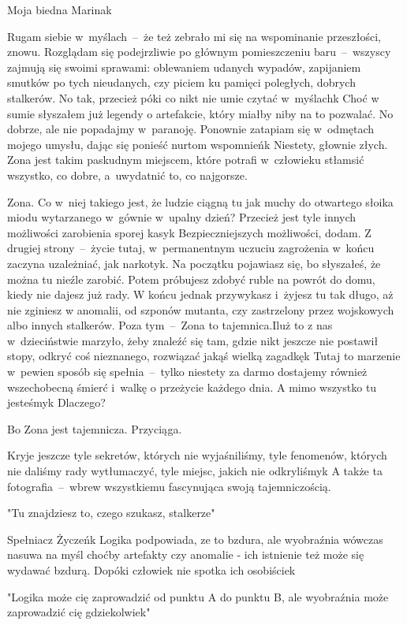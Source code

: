 \documentclass[../MAIN.tex]{subfiles}
\begin{document}
Moja biedna Marina\3k

Rugam siebie w~myślach~--~że też zebrało mi się na wspominanie
przeszłości, znowu. Rozglądam się podejrzliwie po głównym
pomieszczeniu baru~--~wszyscy zajmują się swoimi sprawami:
oblewaniem udanych wypadów, zapijaniem smutków po tych
nieudanych, czy piciem ku pamięci poległych, dobrych stalkerów.
No tak, przecież póki co nikt nie umie czytać w~myślach\3k Choć
w sumie słyszałem już legendy o artefakcie, który miałby niby
na to pozwalać. No dobrze, ale nie popadajmy w~paranoję.
Ponownie zatapiam się w~odmętach mojego umysłu, dając się
ponieść nurtom wspomnień\3k Niestety, głownie złych. Zona jest
takim paskudnym miejscem, które potrafi w~człowieku stłamsić
wszystko, co dobre, a~uwydatnić to, co najgorsze.

Zona. Co w~niej takiego jest, że ludzie ciągną tu jak muchy do
otwartego słoika miodu wytarzanego w~gównie w~upalny dzień?
Przecież jest tyle innych możliwości zarobienia sporej kasy\3k
Bezpieczniejszych możliwości, dodam. Z drugiej strony~--~życie
tutaj, w~permanentnym uczuciu zagrożenia w~końcu zaczyna
uzależniać, jak narkotyk. Na początku pojawiasz się, bo
słyszałeś, że można tu nieźle zarobić. Potem próbujesz zdobyć
ruble na powrót do domu, kiedy nie dajesz już rady. W końcu
jednak przywykasz i~żyjesz tu tak długo, aż nie zginiesz w
anomalii, od szponów mutanta, czy zastrzelony przez wojskowych
albo innych stalkerów. Poza tym~--~Zona to tajemnica.Iluż to z
nas w~dzieciństwie marzyło, żeby znaleźć się tam, gdzie nikt
jeszcze nie postawił stopy, odkryć coś nieznanego, rozwiązać
jakąś wielką zagadkę\3k Tutaj to marzenie w~pewien sposób się
spełnia~--~tylko niestety za darmo dostajemy również
wszechobecną śmierć i~walkę o przeżycie każdego dnia. A mimo
wszystko tu jesteśmy\3k Dlaczego?

Bo Zona jest tajemnicza. Przyciąga.

Kryje jeszcze tyle sekretów, których nie wyjaśniliśmy, tyle
fenomenów, których nie daliśmy rady wytłumaczyć, tyle miejsc,
jakich nie odkryliśmy\3k A także ta fotografia~--~wbrew
wszystkiemu fascynująca swoją tajemniczością.

"Tu znajdziesz to, czego szukasz, stalkerze"

Spełniacz Życzeń\3k Logika podpowiada, ze to bzdura, ale
wyobraźnia wówczas nasuwa na myśl choćby artefakty czy anomalie
- ich istnienie też może się wydawać bzdurą. Dopóki człowiek
nie spotka ich osobiście\3k

"Logika może cię zaprowadzić od punktu A do punktu B, ale
wyobraźnia może zaprowadzić cię gdziekolwiek"
\end{document}
